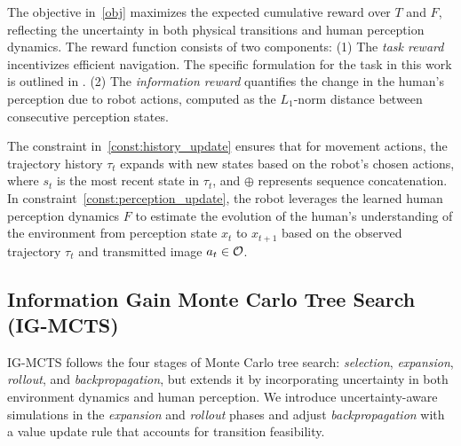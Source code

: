 The objective in~\eqref{obj} maximizes the expected cumulative reward over \( T \) and \( F \), reflecting the uncertainty in both physical transitions and human perception dynamics. The reward function consists of two components: 
(1) The \emph{task reward} incentivizes efficient navigation. The specific formulation for the task in this work is outlined in .
(2) The \emph{information reward} quantifies the change in the human’s perception due to robot actions, computed as the \( L_1 \)-norm distance between consecutive perception states.  

The constraint in~\eqref{const:history_update} ensures that for movement actions, the trajectory history \( \tau_t \) expands with new states based on the robot’s chosen actions, where \( s_t \) is the most recent state in \( \tau_t \), and \( \oplus \) represents sequence concatenation. 
In constraint~\eqref{const:perception_update}, the robot leverages the learned human perception dynamics \( F \) to estimate the evolution of the human’s understanding of the environment from perception state $x_t$ to $x_{t+1}$ based on the observed trajectory \( \tau_t \) and transmitted image \( a_t\in\mathcal{O} \). 

\subsection{Information Gain Monte Carlo Tree Search (IG-MCTS)}
IG-MCTS follows the four stages of Monte Carlo tree search: \emph{selection}, \emph{expansion}, \emph{rollout}, and \emph{backpropagation}, but extends it by incorporating uncertainty in both environment dynamics and human perception. We introduce uncertainty-aware simulations in the \emph{expansion} and \emph{rollout} phases and adjust \emph{backpropagation} with a value update rule that accounts for transition feasibility.

